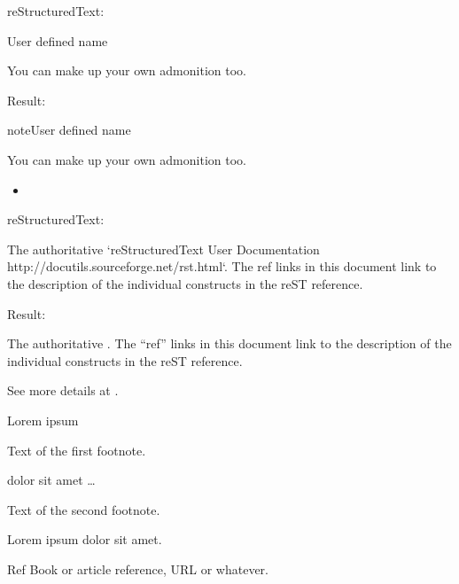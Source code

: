 \documentclass[letterpaper,12pt,english]{sphinxmanual}
\begin{document}
reStructuredText:

\begin{sphinxVerbatim}[commandchars=\\\{\}]
  User defined name

   You can make up your own admonition too.
\end{sphinxVerbatim}

Result:

\begin{sphinxadmonition}{note}{User defined name}

You can make up your own admonition too.
\end{sphinxadmonition}
\begin{itemize}
\item {} 

\end{itemize}

reStructuredText:

\begin{sphinxVerbatim}[commandchars=\\\{\}]
 

   The authoritative {}`reStructuredText User Documentation
   \PYGZlt{}http://docutils.sourceforge.net/rst.html\PYGZgt{}{}`\PYGZus{}.  The \PYGZdq{}ref\PYGZdq{} links in this
   document link to the description of the individual constructs in the reST
   reference.
\end{sphinxVerbatim}

Result:




The authoritative .  The “ref” links in this
document link to the description of the individual constructs in the reST
reference.



See more details at .

Lorem ipsum %
\begin{footnote}[1]\sphinxAtStartFootnote
Text of the first footnote.
%
\end{footnote} dolor sit amet … %
\begin{footnote}[2]\sphinxAtStartFootnote
Text of the second footnote.
%
\end{footnote}

Lorem ipsum  dolor sit amet.

\begin{sphinxthebibliography}{Ref}
Book or article reference, URL or whatever.
\end{sphinxthebibliography}



\renewcommand{\indexname}{Index}
\printindex
\end{document}
